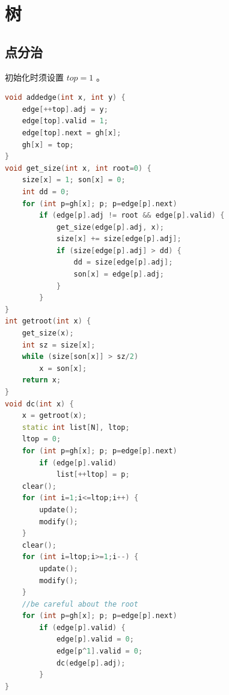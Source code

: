 \documentclass{article}
\begin{document}
\section{树}
\subsection{点分治}
初始化时须设置 $top = 1$ 。
\begin{lstlisting}[language=C++]
void addedge(int x, int y) {
	edge[++top].adj = y;
	edge[top].valid = 1;
	edge[top].next = gh[x];
	gh[x] = top;
}
void get_size(int x, int root=0) {
	size[x] = 1; son[x] = 0;
	int dd = 0;
	for (int p=gh[x]; p; p=edge[p].next)
		if (edge[p].adj != root && edge[p].valid) {
			get_size(edge[p].adj, x);
			size[x] += size[edge[p].adj];
			if (size[edge[p].adj] > dd) {
				dd = size[edge[p].adj];
				son[x] = edge[p].adj;
			}
		}
}
int getroot(int x) {
	get_size(x);
	int sz = size[x];
	while (size[son[x]] > sz/2)
		x = son[x];
	return x;
}
void dc(int x) {
	x = getroot(x);
	static int list[N], ltop;
	ltop = 0;
	for (int p=gh[x]; p; p=edge[p].next)
		if (edge[p].valid)
			list[++ltop] = p;
	clear();
	for (int i=1;i<=ltop;i++) {
		update();
		modify();
	}
	clear();
	for (int i=ltop;i>=1;i--) {
		update();
		modify();
	}
	//be careful about the root
	for (int p=gh[x]; p; p=edge[p].next)
		if (edge[p].valid) {
			edge[p].valid = 0;
			edge[p^1].valid = 0;
			dc(edge[p].adj);
		}
}
\end{lstlisting}
\end{document}
